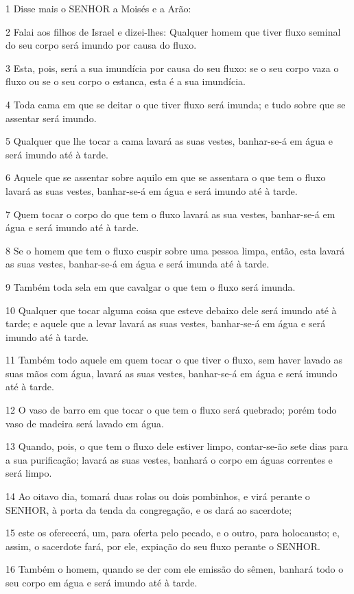 \par 1 Disse mais o SENHOR a Moisés e a Arão:
\par 2 Falai aos filhos de Israel e dizei-lhes: Qualquer homem que tiver fluxo seminal do seu corpo será imundo por causa do fluxo.
\par 3 Esta, pois, será a sua imundícia por causa do seu fluxo: se o seu corpo vaza o fluxo ou se o seu corpo o estanca, esta é a sua imundícia.
\par 4 Toda cama em que se deitar o que tiver fluxo será imunda; e tudo sobre que se assentar será imundo.
\par 5 Qualquer que lhe tocar a cama lavará as suas vestes, banhar-se-á em água e será imundo até à tarde.
\par 6 Aquele que se assentar sobre aquilo em que se assentara o que tem o fluxo lavará as suas vestes, banhar-se-á em água e será imundo até à tarde.
\par 7 Quem tocar o corpo do que tem o fluxo lavará as sua vestes, banhar-se-á em água e será imundo até à tarde.
\par 8 Se o homem que tem o fluxo cuspir sobre uma pessoa limpa, então, esta lavará as suas vestes, banhar-se-á em água e será imunda até à tarde.
\par 9 Também toda sela em que cavalgar o que tem o fluxo será imunda.
\par 10 Qualquer que tocar alguma coisa que esteve debaixo dele será imundo até à tarde; e aquele que a levar lavará as suas vestes, banhar-se-á em água e será imundo até à tarde.
\par 11 Também todo aquele em quem tocar o que tiver o fluxo, sem haver lavado as suas mãos com água, lavará as suas vestes, banhar-se-á em água e será imundo até à tarde.
\par 12 O vaso de barro em que tocar o que tem o fluxo será quebrado; porém todo vaso de madeira será lavado em água.
\par 13 Quando, pois, o que tem o fluxo dele estiver limpo, contar-se-ão sete dias para a sua purificação; lavará as suas vestes, banhará o corpo em águas correntes e será limpo.
\par 14 Ao oitavo dia, tomará duas rolas ou dois pombinhos, e virá perante o SENHOR, à porta da tenda da congregação, e os dará ao sacerdote;
\par 15 este os oferecerá, um, para oferta pelo pecado, e o outro, para holocausto; e, assim, o sacerdote fará, por ele, expiação do seu fluxo perante o SENHOR.
\par 16 Também o homem, quando se der com ele emissão do sêmen, banhará todo o seu corpo em água e será imundo até à tarde.
